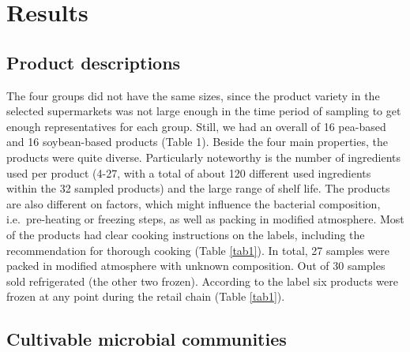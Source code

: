 \documentclass[preprint,3p,
a4paper]{elsarticle} %
\begin{document}
\hypertarget{results}{%
\section{Results}\label{results}}

\hypertarget{product-descriptions}{%
\subsection{Product descriptions}\label{product-descriptions}}

The four groups did not have the same sizes, since the product variety
in the selected supermarkets was not large enough in the time period of
sampling to get enough representatives for each group. Still, we had an
overall of 16 pea-based and 16 soybean-based products (Table 1). Beside
the four main properties, the products were quite diverse. Particularly
noteworthy is the number of ingredients used per product (4-27, with a
total of about 120 different used ingredients within the 32 sampled
products) and the large range of shelf life. The products are also
different on factors, which might influence the bacterial composition,
i.e.~pre-heating or freezing steps, as well as packing in modified
atmosphere. Most of the products had clear cooking instructions on the
labels, including the recommendation for thorough cooking (Table
\ref{tab1}). In total, 27 samples were packed in modified atmosphere
with unknown composition. Out of 30 samples sold refrigerated (the other
two frozen). According to the label six products were frozen at any
point during the retail chain (Table \ref{tab1}).

\hypertarget{cultivable-microbial-communities}{%
\subsection{Cultivable microbial
communities}\label{cultivable-microbial-communities}}
\end{document}
